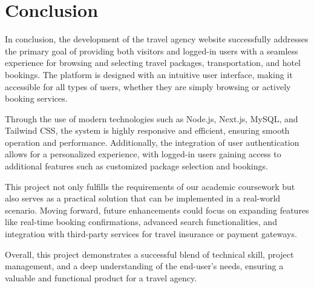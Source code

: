 \documentclass{scrreprt}
\begin{document}
\chapter{Conclusion}

In conclusion, the development of the travel agency website successfully addresses the primary goal of providing both visitors and logged-in users with a seamless experience for browsing and selecting travel packages, transportation, and hotel bookings. The platform is designed with an intuitive user interface, making it accessible for all types of users, whether they are simply browsing or actively booking services.

Through the use of modern technologies such as Node.js, Next.js, MySQL, and Tailwind CSS, the system is highly responsive and efficient, ensuring smooth operation and performance. Additionally, the integration of user authentication allows for a personalized experience, with logged-in users gaining access to additional features such as customized package selection and bookings.

This project not only fulfills the requirements of our academic coursework but also serves as a practical solution that can be implemented in a real-world scenario. Moving forward, future enhancements could focus on expanding features like real-time booking confirmations, advanced search functionalities, and integration with third-party services for travel insurance or payment gateways.

Overall, this project demonstrates a successful blend of technical skill, project management, and a deep understanding of the end-user's needs, ensuring a valuable and functional product for a travel agency.
\end{document}
